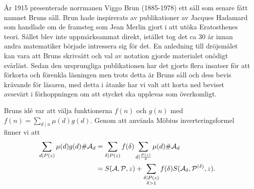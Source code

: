 
År 1915 presenterade norrmanen Viggo Brun (1885-1978) ett såll som senare fått namnet Bruns såll. Brun hade inspirerats av publikationer av Jacques Hadamard som handlade om de framsteg som Jean Merlin gjort i att utöka Eratosthenes teori. Sållet blev inte uppmärksammat direkt, istället tog det ca 30 år innan andra matematiker började intressera sig för det. En anledning till dröjsmålet kan vara att Bruns skrivsätt och val av notation gjorde materialet onödigt svårläst. Sedan den ursprungliga publikationen har det gjorts flera insatser för att förkorta och förenkla läsningen men trots detta är Bruns såll och dess bevis krävande för läsaren, med detta i åtanke har vi valt att korta ned beviset avsevärt i förhoppningen om att stycket ska upplevas som överkomligt.

\bigskip\noindent
Bruns idé var att välja funktionerna $f(n)$ och $g(n)$ med $f(n) = \sum_{d\mid n} \mu(d) g(d)$. Genom att använda Möbius inverteringsformel finner vi att
\begin{align*}
    \sum_{d\mid P(z)} \mu(d) g(d) \# \mathcal{A}_d 
    &= \sum_{\delta\mid P(z)} f(\delta) \sum_{d\mid \frac{P(z)}{\delta}} \mu(d) \# \mathcal{A}_d \\
    &= S(\mathcal{A}, \mathcal{P}, z) + \sum_{\substack{\delta\mid P(z) \\ \delta>1}} f(\delta) S(\mathcal{A_\delta}, \mathcal{P^{(\delta)}}, z).
\end{align*}